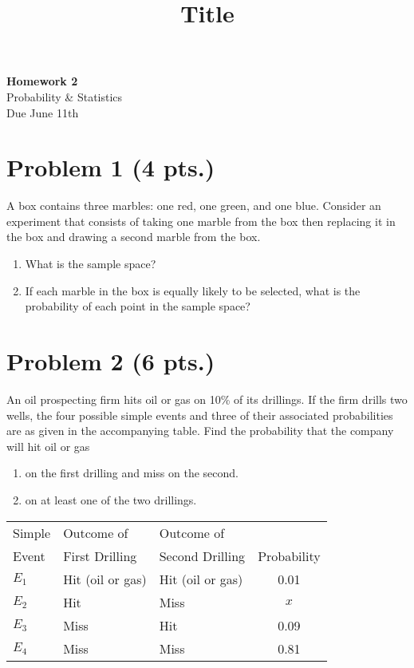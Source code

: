 \documentclass[11pt]{article}
\theoremstyle{definition}
\begin{document}
\title{Title}

\thispagestyle{empty}

\begin{center}
{\LARGE \bf Homework 2} \\
{\large Probability \& Statistics} \\
{\large Due June 11th}
\end{center}

\section*{Problem 1 (4 pts.)}

A box contains three marbles: one red, one green, and one blue. Consider an experiment that consists of taking one marble from the box then replacing it in the box and drawing a second marble from the box.

\begin{enumerate}
	\item What is the sample space?
	\item If each marble in the box is equally likely to be selected, what is the probability of each point in the sample space?
\end{enumerate}

\section*{Problem 2 (6 pts.)}

An oil prospecting firm hits oil or gas on 10\% of its drillings. If the firm drills two wells, the four possible simple events and three of their associated probabilities are as given in the accompanying table. Find the probability that the company will hit oil or gas

\begin{enumerate}
	\item on the first drilling and miss on the second.
	\item on at least one of the two drillings.
\end{enumerate}

\begin{table}[H]
	\centering
	\begin{tabular}{lllc}
		\hline
		Simple & Outcome of & Outcome of & \\
		Event & First Drilling & Second Drilling & Probability \\
		\hline
		$E_1$ & Hit (oil or gas) & Hit (oil or gas) & 0.01 \\
		$E_2$ & Hit & Miss & $x$ \\
		$E_3$ & Miss & Hit & 0.09 \\
		$E_4$ & Miss & Miss & 0.81 \\
		\hline
	\end{tabular}
\end{table}
\end{document}
